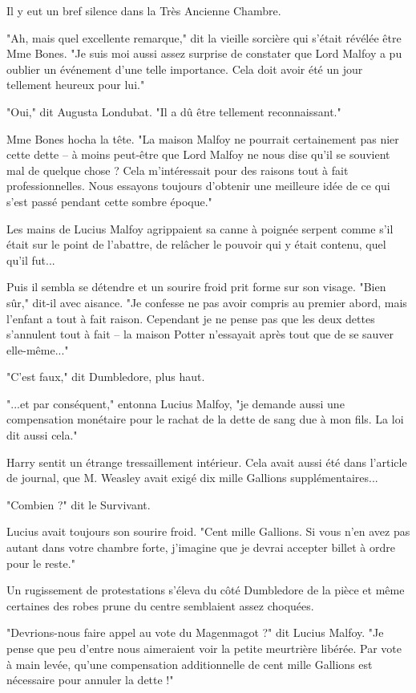 Il y eut un bref silence dans la Très Ancienne Chambre.

"Ah, mais quel excellente remarque," dit la vieille sorcière qui s'était révélée être Mme Bones. "Je suis moi aussi assez surprise de constater que Lord Malfoy a pu oublier un événement d'une telle importance. Cela doit avoir été un jour tellement heureux pour lui."

"Oui," dit Augusta Londubat. "Il a dû être tellement reconnaissant."

Mme Bones hocha la tête. "La maison Malfoy ne pourrait certainement pas nier cette dette – à moins peut-être que Lord Malfoy ne nous dise qu'il se souvient mal de quelque chose ? Cela m'intéressait pour des raisons tout à fait professionnelles. Nous essayons toujours d'obtenir une meilleure idée de ce qui s'est passé pendant cette sombre époque."

Les mains de Lucius Malfoy agrippaient sa canne à poignée serpent comme s'il était sur le point de l'abattre, de relâcher le pouvoir qui y était contenu, quel qu'il fut...

Puis il sembla se détendre et un sourire froid prit forme sur son visage. "Bien sûr," dit-il avec aisance. "Je confesse ne pas avoir compris au premier abord, mais l'enfant a tout à fait raison. Cependant je ne pense pas que les deux dettes s'annulent tout à fait – la maison Potter n'essayait après tout que de se sauver elle-même..."

"C'est faux," dit Dumbledore, plus haut.

"...et par conséquent," entonna Lucius Malfoy, "je demande aussi une compensation monétaire pour le rachat de la dette de sang due à mon fils. La loi dit aussi cela."

Harry sentit un étrange tressaillement intérieur. Cela avait aussi été dans l'article de journal, que M. Weasley avait exigé dix mille Gallions supplémentaires...

"Combien ?" dit le Survivant.

Lucius avait toujours son sourire froid. "Cent mille Gallions. Si vous n'en avez pas autant dans votre chambre forte, j'imagine que je devrai accepter billet à ordre pour le reste."

Un rugissement de protestations s'éleva du côté Dumbledore de la pièce et même certaines des robes prune du centre semblaient assez choquées.

"Devrions-nous faire appel au vote du Magenmagot ?" dit Lucius Malfoy. "Je pense que peu d'entre nous aimeraient voir la petite meurtrière libérée. Par vote à main levée, qu'une compensation additionnelle de cent mille Gallions est nécessaire pour annuler la dette !"

